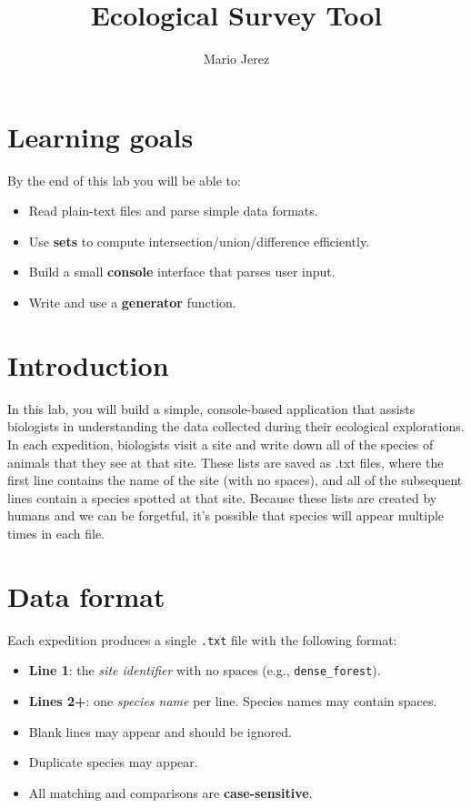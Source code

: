 \documentclass[12pt,letterpaper]{article}
\title{Ecological Survey Tool}
\date{}
\author{Mario Jerez}
\begin{document}
\maketitle

\section*{Learning goals}
By the end of this lab you will be able to:
\begin{itemize}
  \item Read plain-text files and parse simple data formats.
  \item Use \textbf{sets} to compute intersection/union/difference efficiently.
  \item Build a small \textbf{console} interface that parses user input.
  \item Write and use a \textbf{generator} function.
\end{itemize}

\section{Introduction}

In this lab, you will build a simple, console-based application that assists biologists in understanding the data collected during their ecological explorations. In each expedition, biologists visit a site and write down all of the species of animals that they see at that site. These lists are saved as .txt files, where the first line contains the name of the site (with no spaces), and all of the subsequent lines contain a species spotted at that site. Because these lists are created by humans and we can be forgetful, it's possible that species will appear multiple times in each file.


\section{Data format}
Each expedition produces a single \texttt{.txt} file with the following format:
\begin{itemize}
  \item \textbf{Line 1}: the \emph{site identifier} with no spaces (e.g., \texttt{dense\_forest}).
  \item \textbf{Lines 2+}: one \emph{species name} per line. Species names may contain spaces.
  \item Blank lines may appear and should be ignored.
  \item Duplicate species may appear.
  \item All matching and comparisons are \textbf{case-sensitive}.
\end{itemize}
\end{document}
